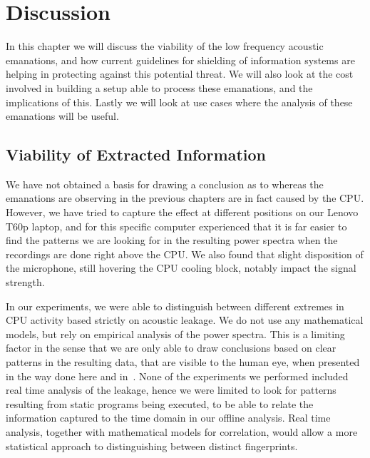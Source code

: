 \chapter{Discussion}\label{chp6:discussion}

In this chapter we will discuss the viability of the low frequency acoustic emanations, and how current guidelines for shielding of information systems are helping in protecting against this potential threat.
We will also look at the cost involved in building a setup able to process these emanations, and the implications of this.
Lastly we will look at use cases where the analysis of these emanations will be useful.

\section{Viability of Extracted Information}
We have not obtained a basis for drawing a conclusion as to whereas the emanations are observing in the previous chapters are in fact caused by the CPU.
However, we have tried to capture the effect at different positions on our Lenovo T60p laptop, and for this specific computer experienced that it is far easier to find the patterns we are looking for in the resulting power spectra when the recordings are done right above the CPU.
We also found that slight disposition of the microphone, still hovering the CPU cooling block, notably impact the signal strength.

In our experiments, we were able to distinguish between different extremes in CPU activity based strictly on acoustic leakage. 
We do not use any mathematical models, but rely on empirical analysis of the power spectra. 
This is a limiting factor in the sense that we are only able to draw conclusions based on clear patterns in the resulting data, that are visible to the human eye, when presented in the way done here and in~\cite{DBLP:conf/crypto/GenkinST14}.
None of the experiments we performed included real time analysis of the leakage, hence we were limited to look for patterns resulting from static programs being executed, to be able to relate the information captured to the time domain in our offline analysis.
Real time analysis, together with mathematical models for correlation, would allow a more statistical approach to distinguishing between distinct fingerprints.


